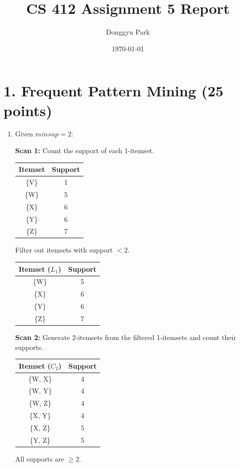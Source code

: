 \documentclass[12pt]{article}
\title{CS 412 Assignment 5 Report}
\author{Donggyu Park}
\date{\today}
\begin{document}
\maketitle

\section*{1. Frequent Pattern Mining (25 points)}

\begin{enumerate}[label=(\alph*)]
    \item
    Given $minsup = 2$:

    \textbf{Scan 1:} Count the support of each 1-itemset.
    \begin{center}
    \begin{tabular}{|c|c|}
        \hline
        \textbf{Itemset} & \textbf{Support} \\ \hline
        \{V\} & 1 \\ \hline
        \{W\} & 5 \\ \hline
        \{X\} & 6 \\ \hline
        \{Y\} & 6 \\ \hline
        \{Z\} & 7 \\ \hline
    \end{tabular}
    \end{center}
    Filter out itemsets with support $< 2$.
    \begin{center}
    \begin{tabular}{|c|c|}
        \hline
        \textbf{Itemset ($L_1$)} & \textbf{Support} \\ \hline
        \{W\} & 5 \\ \hline
        \{X\} & 6 \\ \hline
        \{Y\} & 6 \\ \hline
        \{Z\} & 7 \\ \hline
    \end{tabular}
    \end{center}

    \textbf{Scan 2:} Generate 2-itemsets from the filtered 1-itemsets and count their supports.
    \begin{center}
    \begin{tabular}{|c|c|}
        \hline
        \textbf{Itemset ($C_2$)} & \textbf{Support} \\ \hline
        \{W, X\} & 4 \\ \hline
        \{W, Y\} & 4 \\ \hline
        \{W, Z\} & 4 \\ \hline
        \{X, Y\} & 4 \\ \hline
        \{X, Z\} & 5 \\ \hline
        \{Y, Z\} & 5 \\ \hline
    \end{tabular}
    \end{center}
    All supports are $\ge 2$.
    \newpage


\end{enumerate}
\end{document}
